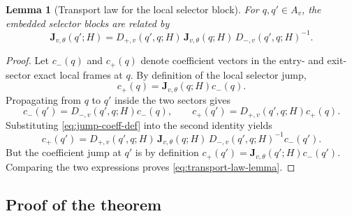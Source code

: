 \documentclass[11pt]{article}
\numberwithin{equation}{section}
\newtheorem{lemma}[theorem]{Lemma}
\theoremstyle{definition}
\newcommand{\Jemb}{\mathbf J_{v,\theta}}
\begin{document}
\begin{lemma}[Transport law for the local selector block]
\label{lem:transport-law}
For $q,q'\in A_v$, the embedded selector blocks are related by
\begin{equation}
\label{eq:transport-law-lemma}
\Jemb(q';H)=D_{+,v}(q',q;H)\,\Jemb(q;H)\,D_{-,v}(q',q;H)^{-1}.
\end{equation}
\end{lemma}

\begin{proof}
Let $c_-(q)$ and $c_+(q)$ denote coefficient vectors in the entry- and exit-sector exact local frames at $q$. By definition of the local selector jump,
\begin{equation}
\label{eq:jump-coeff-def}
 c_+(q)=\Jemb(q;H)c_-(q).
\end{equation}
Propagating from $q$ to $q'$ inside the two sectors gives
\[
 c_-(q')=D_{-,v}(q',q;H)c_-(q),
 \qquad
 c_+(q')=D_{+,v}(q',q;H)c_+(q).
\]
Substituting \eqref{eq:jump-coeff-def} into the second identity yields
\[
 c_+(q')=D_{+,v}(q',q;H)\,\Jemb(q;H)\,D_{-,v}(q',q;H)^{-1}c_-(q').
\]
But the coefficient jump at $q'$ is by definition $c_+(q')=\Jemb(q';H)c_-(q')$. Comparing the two expressions proves \eqref{eq:transport-law-lemma}.
\end{proof}

\subsection{Proof of the theorem}
\end{document}
